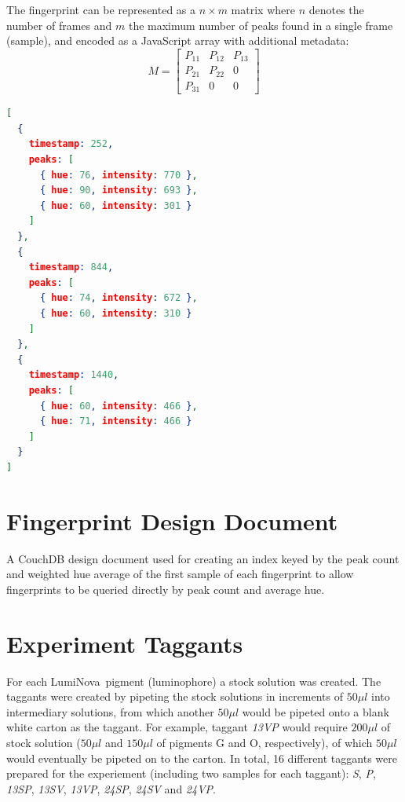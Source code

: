 \documentclass[thesis.tex]{subfiles}
\begin{document}
The fingerprint can be represented as a $n \times m$ matrix where $n$ denotes the number of frames and $m$ the maximum number of peaks found in a single frame (sample), and encoded as a JavaScript array with additional metadata:
\[
M=
  \begin{bmatrix}
    P_{11} & P_{12} & P_{13} \\
    P_{21} & P_{22} & 0 \\
    P_{31} & 0 & 0
  \end{bmatrix}
\]
\begin{lstlisting}[language=json,firstnumber=1]
[
  {
    timestamp: 252,
    peaks: [
      { hue: 76, intensity: 770 },
      { hue: 90, intensity: 693 },
      { hue: 60, intensity: 301 }
    ]
  },
  {
    timestamp: 844,
    peaks: [
      { hue: 74, intensity: 672 },
      { hue: 60, intensity: 310 }
    ]
  },
  {
    timestamp: 1440,
    peaks: [
      { hue: 60, intensity: 466 },
      { hue: 71, intensity: 466 }
    ]
  }
]
\end{lstlisting}


\chapter{Fingerprint Design Document}
\label{appendix:fingerprint-design-doc}
A CouchDB design document used for creating an index keyed by the peak count and weighted hue average of the first sample of each fingerprint to allow fingerprints to be queried directly by peak count and average hue.
\vspace{5mm}



\chapter{Experiment Taggants}
\label{appendix:taggants}
\enlargethispage{10\baselineskip}
For each LumiNova\textregistered\ pigment (luminophore) a stock solution was created. The taggants were created by pipeting the stock solutions in increments of $50\mu l$ into intermediary solutions, from which another $50\mu l$ would be pipeted onto a blank white carton as the taggant. For example, taggant \emph{13VP} would require $200\mu l$ of stock solution ($50\mu l$ and $150\mu l$ of pigments G and O, respectively), of which $50\mu l$ would eventually be pipeted on to the carton. In total, 16 different taggants were prepared for the experiement (including two samples for each taggant): \emph{S}, \emph{P}, \emph{13SP}, \emph{13SV}, \emph{13VP}, \emph{24SP}, \emph{24SV} and \emph{24VP}.
\end{document}
